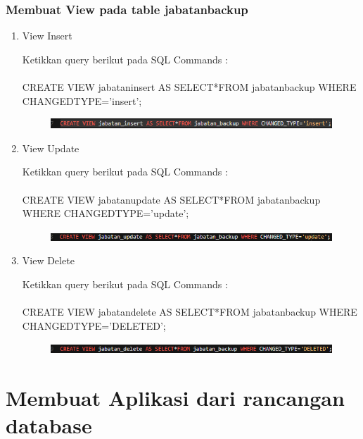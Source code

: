 \documentclass[12pt, times new roman, a4paper]{report}
\begin{document}
\subsubsection{Membuat View pada table jabatan\textunderscore backup}
\begin{enumerate}
\item View Insert
\par Ketikkan query berikut pada SQL Commands :\\
\\
CREATE VIEW jabatan\textunderscore insert AS SELECT*FROM jabatan\textunderscore backup WHERE CHANGED\textunderscore TYPE='insert';
\begin{figure}[h]
	\centering
		\includegraphics[scale=1]{gambar/23}
\end{figure}

\item View Update
\par Ketikkan query berikut pada SQL Commands :\\
\\
CREATE VIEW jabatan\textunderscore update AS SELECT*FROM jabatan\textunderscore backup WHERE CHANGED\textunderscore TYPE='update';
\begin{figure}[h]
	\centering
		\includegraphics[scale=1]{gambar/24}
\end{figure}

\item View Delete
\par Ketikkan query berikut pada SQL Commands :\\
\\
CREATE VIEW jabatan\textunderscore delete AS SELECT*FROM jabatan\textunderscore backup WHERE CHANGED\textunderscore TYPE='DELETED';
\begin{figure}[h]
	\centering
		\includegraphics[scale=1]{gambar/25}
\end{figure}
\end{enumerate}

\newpage
\section{Membuat Aplikasi dari rancangan database}
\end{document}
